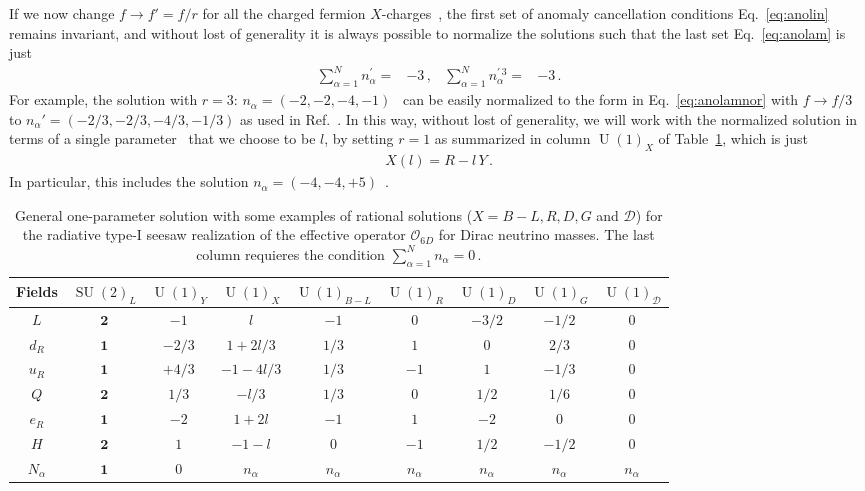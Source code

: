 \documentclass[prd,amsfonts,aps,nofootinbib,notitlepage,11pt,superscriptaddress]{revtex4-1}
\begin{document}
If we now change $f\to f'= f/r$ for all the charged fermion $X$-charges~\cite{Allanach:2018vjg}, the
first set of anomaly cancellation conditions Eq.~\eqref{eq:anolin} remains
invariant, and without lost of generality it is always possible to
normalize the solutions such that the last set Eq.~\eqref{eq:anolam} is
just
\begin{align}
  \label{eq:anolamnor}
   \sum_{\alpha=1}^{N} n_{\alpha}^{\prime}=&-3\,,   & \sum_{\alpha=1}^{N} n_{\alpha}^{\prime\, 3}=&-3\,.
\end{align}
For example, the solution with $r=3$: $n_{\alpha}=\left( -2,-2,-4,-1 \right)$~\cite{Appelquist:2002mw} can be easily normalized to the form in Eq.~\eqref{eq:anolamnor} with $f\to f/3$
to $n_{\alpha}'=\left( -2/3,-2/3,-4/3,-1/3 \right)$
as used in Ref.~\cite{Patra:2016ofq}. In this way, without lost of generality, we will work with the normalized solution in terms of a single parameter~\cite{Jenkins:1987ue,Oda:2015gna,Okada:2018tgy} that we choose to be $l$, by setting $r=1$ as summarized in column $\operatorname{U}(1)_X$ of Table~\ref{tab:partcont3}, which is just
\begin{align}
  X(l)=R-l\, Y\,.
\end{align}
In particular, this includes the solution  $n_{\alpha}=(-4,-4,+5)$~\cite{Appelquist:2002mw}. 



%
\begin{table}
  \centering
  \begin{tabular}{|c|c|c|c|c|c|c|c||c|}
    \hline  
    Fields     & $\operatorname{SU}(2)_L$ &  $\operatorname{U}(1)_Y $ & $\operatorname{U}(1)_{X}$& $\operatorname{U}(1)_{B-L}$& $\operatorname{U}(1)_R$& $\operatorname{U}(1)_D$& $\operatorname{U}(1)_G$ & $\operatorname{U}(1)_{\mathcal{D}}$\\ \hline
$L $     & $\boldsymbol{2}$ & $-1$ & $l$      &  $-1$&    $0$ &  $-3/2$&  $-1/2$ & $0$ \\    
$d_R $   & $\boldsymbol{1}$ & $-2/3$ & $1+2l/3$ &  $1/3$&    $1$&  $0$&    $2/3$ & $0$\\
$u_R $   & $\boldsymbol{1}$ & $+4/3$ & $-1-4l/3$&  $1/3$&   $-1$&  $1$&   $-1/3$ & $0$ \\
$Q $     & $\boldsymbol{2}$ & $1/3$ & $-l/3$   & $1/3$&    $0$&  $1/2$&  $1/6$ & $0$ \\
$e_R $   & $\boldsymbol{1}$ & $-2$   & $1+2l$   &  $-1$&    $1$ &  $-2$&  $0$ & $0$\\\hline
$H $     & $\boldsymbol{2}$ & $1$  & $-1-l$   &  $0$&    $-1$ &  $1/2$&  $-1/2$ & $0$ \\\hline
$N_\alpha$& $\boldsymbol{1}$ & $0$   & $n_\alpha$& $n_\alpha$&  $n_\alpha$ & $n_\alpha$& $n_\alpha$ & $n_\alpha$\\\hline
  \end{tabular}
  \caption{General one-parameter solution with some examples of rational solutions
    ($X=B-L,R,D,G$ and $\mathcal{D}$) for the radiative type-I seesaw realization
    of the effective operator $\mathcal{O}_{6D}$ for Dirac neutrino masses. The
    last column requieres the condition $\sum_{\alpha=1}^N n_\alpha=0$\,.}
    \label{tab:partcont3}
\end{table}
%
\end{document}
